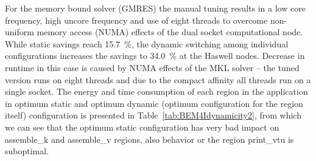 For the memory bound solver (GMRES) the manual tuning results in a low core frequency, high uncore frequency and use of eight threads to overcome non-uniform memory access (NUMA) effects of the dual socket computational node. While static savings reach 15.7~\%, the dynamic switching among individual configurations increases the savings to 34.0~\% at the Haswell nodes. Decrease in runtime in this case is caused by NUMA effects of the MKL solver -- the tuned version runs on eight threads and due to the compact affinity all threads run on a single socket.
The energy and time consumption of each region in the application in optimum static and optimum dynamic (optimum configuration for the region itself) configuration is presented in Table~\ref{tab:BEM4Idynamicity2}, from which we can see that the optimum static configuration has very bad impact on assemble\_k and assemble\_v regions, also behavior or the region print\_vtu is suboptimal.


